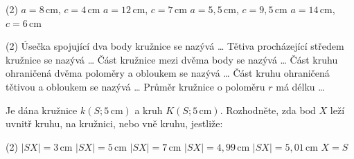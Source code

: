 \documentclass[12pt,a4paper]{article}
\begin{document}

\begin{exercise}

    \begin{tasks}(2)
        \task $a=8\,\mathrm{cm}$, $c=4\,\mathrm{cm}$
        \task $a=12\,\mathrm{cm}$, $c=7\,\mathrm{cm}$
        \task $a=5{,}5\,\mathrm{cm}$, $c=9{,}5\,\mathrm{cm}$
        \task $a=14\,\mathrm{cm}$, $c=6\,\mathrm{cm}$
    \end{tasks}

\end{exercise}



\setcounter{section}{5}


\begin{exercise}

    \begin{tasks}(2)
        \task Úsečka spojující dva body kružnice se nazývá \dots
        \task Tětiva procházející středem kružnice se nazývá \dots
        \task Část kružnice mezi dvěma body se nazývá \dots
        \task Část kruhu ohraničená dvěma poloměry a obloukem se nazývá \dots
        \task Část kruhu ohraničená tětivou a obloukem se nazývá \dots
        \task Průměr kružnice o poloměru $r$ má délku \dots
    \end{tasks}

\end{exercise}



\begin{exercise}

    Je dána kružnice $k(S;5\,\mathrm{cm})$ a kruh $K(S;5\,\mathrm{cm})$.
    Rozhodněte, zda bod $X$ leží uvnitř kruhu, na kružnici, nebo vně kruhu, jestliže:

    \begin{tasks}(2)
        \task $|SX|=3\,\mathrm{cm}$
        \task $|SX|=5\,\mathrm{cm}$
        \task $|SX|=7\,\mathrm{cm}$
        \task $|SX|=4{,}99\,\mathrm{cm}$
        \task $|SX|=5{,}01\,\mathrm{cm}$
        \task $X=S$
    \end{tasks}

\end{exercise}
\end{document}
